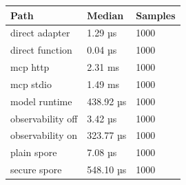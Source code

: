 \begin{tabular}{lll}
\hline
Path & Median & Samples \\
\hline
direct adapter & 1.29 µs & 1000 \\
direct function & 0.04 µs & 1000 \\
mcp http & 2.31 ms & 1000 \\
mcp stdio & 1.49 ms & 1000 \\
model runtime & 438.92 µs & 1000 \\
observability off & 3.42 µs & 1000 \\
observability on & 323.77 µs & 1000 \\
plain spore & 7.08 µs & 1000 \\
secure spore & 548.10 µs & 1000 \\
\hline
\end{tabular}
